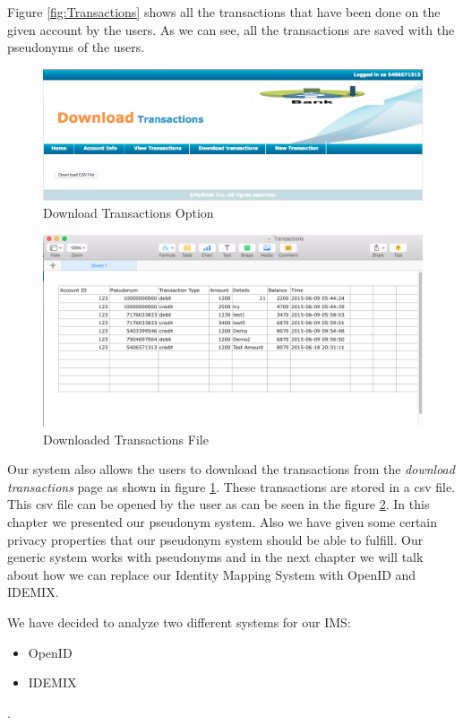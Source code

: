 Figure \ref{fig:Transactions} shows all the transactions that have been done on the given account by the users. As we can see, all the transactions are saved with the pseudonyms of the users.
\begin{figure}[h]
	\centering
	\includegraphics[width=\textwidth]{figures/Download}
	\caption{Download Transactions Option}
	\label{fig:Download}
\end{figure}
\begin{figure}[h]
	\centering
	\includegraphics[width=\textwidth]{figures/File}
	\caption{Downloaded Transactions File}
	\label{fig:File}
\end{figure}	
Our system also allows the users to download the transactions from the \textit{download transactions} page as shown in figure \ref{fig:Download}. These transactions are stored in a csv file. This csv file can be opened by the user as can be seen in the figure \ref{fig:File}.
\FloatBarrier
In this chapter we presented our pseudonym system. Also we have given some certain privacy properties that our pseudonym system should be able to fulfill. Our generic system works with pseudonyms and in the next chapter we will talk about how we can replace our Identity Mapping System with OpenID and IDEMIX.

We have decided to analyze two different systems for our IMS:
\begin{itemize}
	\item OpenID
	\item IDEMIX
\end{itemize}.